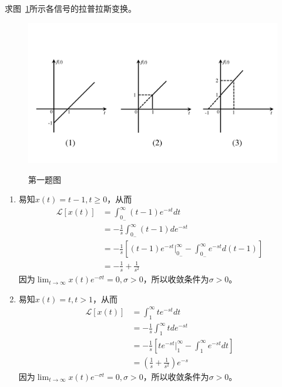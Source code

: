 \documentclass[answers]{exam}  %
\begin{document}
\Large
{}
\begin{questions}
	
	

\question 求图~\ref{Figure:question_1}所示各信号的拉普拉斯变换。
\begin{figure}[!h]
	\centering
	\includegraphics[width=\linewidth]{pics/question_1.pdf}
	\label{Figure:question_1}
	\caption{第一题图}
\end{figure}
\begin{solution}
\begin{enumerate}[(1)]
	\item 易知$x(t)=t-1,t\geq0$，从而\begin{align*}
		\mathcal{L}[x(t)]&=\int_{0_-}^{\infty}(t-1)e^{-st}dt\\
		&=-\frac{1}{s}\int_{0_-}^{\infty}(t-1)de^{-st}\\
		&=-\frac{1}{s}[(t-1)e^{-st}\big|_{0_-}^{\infty}-\int_{0_-}^{\infty}e^{-st}d(t-1)]\\
		&=-\frac{1}{s}+\frac{1}{s^2}
	\end{align*}
    因为$\lim_{t\rightarrow\infty}x(t)e^{-\sigma t}=0,\sigma>0$，所以收敛条件为$\sigma>0$。
    \item 易知$x(t)=t,t>1$，从而\begin{align*}
    	\mathcal{L}[x(t)]&=\int_{1}^{\infty}te^{-st}dt\\
    	&=-\frac{1}{s}\int_{1}^{\infty}tde^{-st}\\
    	&=-\frac{1}{s}[te^{-st}\big|_{1}^{\infty}-\int_{1}^{\infty}e^{-st}dt]\\
    	&=(\frac{1}{s}+\frac{1}{s^2})e^{-s}
    \end{align*}
    因为$\lim_{t\rightarrow\infty}x(t)e^{-\sigma t}=0,\sigma>0$，所以收敛条件为$\sigma>0$。

\end{enumerate}
\end{solution}
\end{questions}
\end{document}
